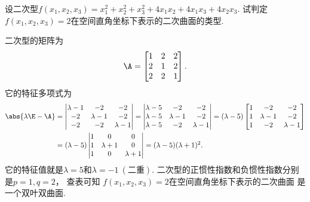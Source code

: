 \begin{example}
设二次型\(f(x_1,x_2,x_3) = x_1^2 + x_2^2 + x_3^2 + 4 x_1 x_2 + 4 x_1 x_3 + 4 x_2 x_3\).
试判定\(f(x_1,x_2,x_3) = 2\)在空间直角坐标下表示的二次曲面的类型.
\begin{solution}
二次型的矩阵为\[
	\A = \begin{bmatrix}
		1 & 2 & 2 \\
		2 & 1 & 2 \\
		2 & 2 & 1
	\end{bmatrix}.
\]
它的特征多项式为\begin{align*}
	\abs{\lambda\E-\A}
	&= \begin{vmatrix}
		\lambda-1 & -2 & -2 \\
		-2 & \lambda-1 & -2 \\
		-2 & -2 & \lambda-1
	\end{vmatrix}
	= \begin{vmatrix}
		\lambda-5 & -2 & -2 \\
		\lambda-5 & \lambda-1 & -2 \\
		\lambda-5 & -2 & \lambda-1
	\end{vmatrix}
	= (\lambda-5)
	\begin{bmatrix}
		1 & -2 & -2 \\
		1 & \lambda-1 & -2 \\
		1 & -2 & \lambda-1
	\end{bmatrix} \\
	&= (\lambda-5)
	\begin{vmatrix}
		1 & 0 & 0 \\
		1 & \lambda+1 & 0 \\
		1 & 0 & \lambda+1
	\end{vmatrix}
	= (\lambda-5)(\lambda+1)^2.
\end{align*}
它的特征值就是\(\lambda=5\)和\(\lambda=-1\ (\text{二重})\).
二次型的正惯性指数和负惯性指数分别是\(p=1,q=2\)，
查表可知%
\(f(x_1,x_2,x_3) = 2\)在空间直角坐标下表示的二次曲面
是一个双叶双曲面.
\end{solution}
\end{example}
